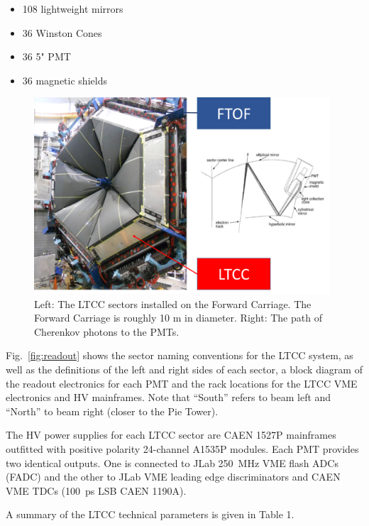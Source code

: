 \documentclass{article}
\begin{document}
\begin{itemize}
\item 108 lightweight mirrors
\item  36 Winston Cones
\item  36 5" PMT
\item  36 magnetic shields 
\end{itemize}

\begin{figure}[ht]
  \centering
		\includegraphics[width=0.98\textwidth]{img/ltccSectors}
		\caption{	Left: The LTCC sectors installed on the Forward Carriage. 
		The Forward Carriage is roughly 10 m in diameter.
		Right: The path of Cherenkov photons to the PMTs.}
 		\label{fig:ltccSectors}
\end{figure}

\clearpage

Fig.~\ref{fig:readout} shows the sector naming conventions for the LTCC system, 
as well as the definitions of the left and right sides of each sector, a block diagram of the readout electronics 
for each PMT and the rack locations for the LTCC VME electronics and HV mainframes.
Note that ``South'' refers to beam left and ``North'' to beam right (closer to the Pie Tower). 

The HV power supplies for each LTCC sector are  CAEN 1527P mainframes 
outfitted with positive polarity 24-channel A1535P modules. 
Each PMT provides two identical outputs. One is connected to JLab 
250~MHz VME flash ADCs (FADC) and the other to JLab VME leading edge discriminators and 
CAEN VME TDCs (100~ps LSB CAEN 1190A).


A summary of the LTCC technical parameters is given in Table 1.
\end{document}

